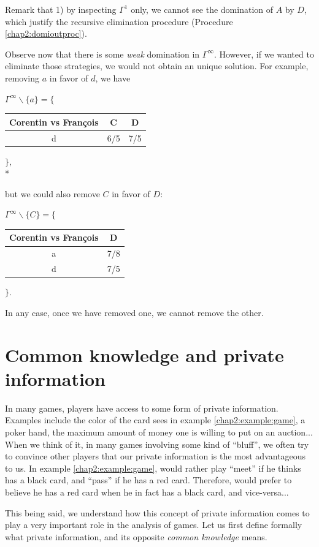 \begin{example}
Remark that 1) by inspecting $\Gamma^1$ only, we cannot see the domination of $A$ by $D$, which justify the recursive elimination procedure (Procedure \ref{chap2:domioutproc}).

Observe now that there is some \emph{weak} domination in $\Gamma^\infty$. However, if we wanted to eliminate those strategies, we would not obtain an unique solution.
For example, removing $a$ in favor of $d$, we have
\begin{center}
$\Gamma^{\infty}\backslash \{ a \}= \Bigg \{$
\begin{tabular}{c|cc}
  Corentin vs Fran\c{c}ois   & C & D\\ 
\hline d   & 6/5 & 7/5 \\
\end{tabular} 
$\Bigg \},$\\*
\end{center}
but we could also remove $C$ in favor of $D$:
\begin{center}
$\Gamma^{\infty}  \backslash \{C\} = \Bigg \{$
\begin{tabular}{c|c}
  Corentin vs Fran\c{c}ois   & D\\ 
\hline a   & 7/8 \\
 d   & 7/5 \\
\end{tabular} 
$\Bigg \}.$
\end{center}
In any case, once we have removed one, we cannot remove the other. 
\end{example}

\section{Common knowledge and private information}
 
 
In many games, players have access to some form of private information.
Examples include the color of the card \TAtwo{} sees in example \ref{chap2:example:game}, a poker hand, the maximum amount of money one is willing to put on an auction... When we think of it, in many games involving some kind of ``bluff'', we often try to convince other players that our private information is the most advantageous to us.
In example \ref{chap2:example:game}, \TAone{} would rather play ``meet'' if he thinks \TAtwo{} has a black card, and ``pass'' if he has a red card. Therefore, \TAtwo{} would prefer \TAone{} to believe he has a red card when he in fact has a black card, and vice-versa...

This being said, we understand how this concept of private information comes to play a very important role in the analysis of games. Let us first define formally 
what private information, and its opposite \emph{common knowledge} means.

